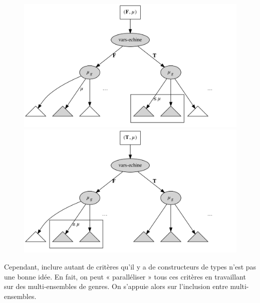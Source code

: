 \documentclass[a4paper]{report}
\theoremstyle{definition}
\begin{document}
\begin{figure}[h]
	\begin{center}
		\includegraphics[scale=0.13]{graphs/crit2_1}
		\includegraphics[scale=0.13]{graphs/crit2_2}
	\end{center}
	\caption{\label{fig_crit2}}
\end{figure}

Cependant, inclure autant de critères qu'il y a de constructeurs de types n'est pas une bonne idée. En fait, on peut « paralléliser » tous ces critères en travaillant sur des multi-ensembles de genres. On s'appuie alors sur l'inclusion entre multi-ensembles.
\end{document}
